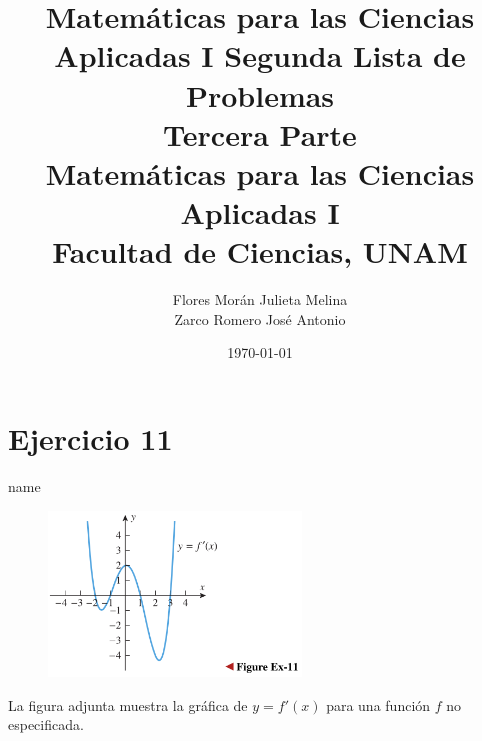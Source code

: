 \documentclass[12pt]{article}
\title{Matemáticas para las Ciencias Aplicadas I}
\title{
	Segunda Lista de Problemas \\
	\textbf{Tercera  Parte} \\
	\vspace{1ex}
	\large Matemáticas para las Ciencias Aplicadas I \\
	Facultad de Ciencias, UNAM}
\date{\today}
\author{Flores Morán Julieta Melina \\ Zarco Romero José Antonio}
\begin{document}
\maketitle


\section{Ejercicio 11} name \\

\begin{figure}[h!]
\centering
\includegraphics[width=0.6\textwidth]{../img/img_Lista2/3_11.png}
\end{figure}
La figura adjunta muestra la gráfica de $y = f'(x)$ para una función $f$ no especificada.
\end{document}
